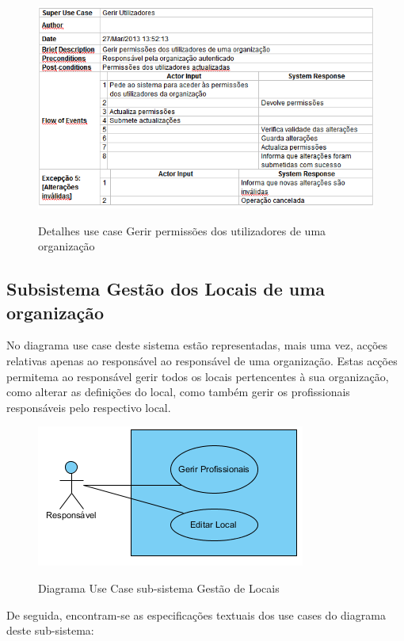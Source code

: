 ﻿\documentclass[12pt,a4paper]{article}
\begin{document}
\begin{figure}[h!]
\centering
\includegraphics[scale=0.7]{d_usecase/R_permissoes}
\label{usecase}
\caption{Detalhes use case Gerir permissões dos utilizadores de uma organização}
\end{figure}

\clearpage
\clearpage

\subsection{Subsistema Gestão dos Locais de uma organização}
No diagrama use case deste sistema estão representadas, mais uma vez, acções relativas
apenas ao responsável ao responsável de uma organização. Estas acções permitema ao responsável gerir todos os locais pertencentes à sua organização, como alterar as definições do local, como também gerir os profissionais responsáveis pelo respectivo local.\\

\begin{figure}[h!]
\centering
\includegraphics[scale=1]{usecase/R_GerirLocal}
\label{usecase}
\caption{Diagrama Use Case sub-sistema Gestão de Locais}
\end{figure}

De seguida, encontram-se as especificações textuais dos use cases do diagrama deste sub-sistema:\\
\end{document}
